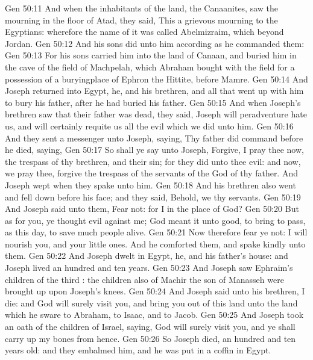 \vs Gen 50:11 And when the inhabitants of the land, the Canaanites, saw the mourning in the floor of Atad, they said, This  a grievous mourning to the Egyptians: wherefore the name of it was called Abelmizraim, which  beyond Jordan.
\vs Gen 50:12 And his sons did unto him according as he commanded them:
\vs Gen 50:13 For his sons carried him into the land of Canaan, and buried him in the cave of the field of Machpelah, which Abraham bought with the field for a possession of a buryingplace of Ephron the Hittite, before Mamre.
\vs Gen 50:14 And Joseph returned into Egypt, he, and his brethren, and all that went up with him to bury his father, after he had buried his father.
\vs Gen 50:15 And when Joseph's brethren saw that their father was dead, they said, Joseph will peradventure hate us, and will certainly requite us all the evil which we did unto him.
\vs Gen 50:16 And they sent a messenger unto Joseph, saying, Thy father did command before he died, saying,
\vs Gen 50:17 So shall ye say unto Joseph, Forgive, I pray thee now, the trespass of thy brethren, and their sin; for they did unto thee evil: and now, we pray thee, forgive the trespass of the servants of the God of thy father. And Joseph wept when they spake unto him.
\vs Gen 50:18 And his brethren also went and fell down before his face; and they said, Behold, we  thy servants.
\vs Gen 50:19 And Joseph said unto them, Fear not: for  I in the place of God?
\vs Gen 50:20 But as for you, ye thought evil against me;  God meant it unto good, to bring to pass, as  this day, to save much people alive.
\vs Gen 50:21 Now therefore fear ye not: I will nourish you, and your little ones. And he comforted them, and spake kindly unto them.
\vs Gen 50:22 And Joseph dwelt in Egypt, he, and his father's house: and Joseph lived an hundred and ten years.
\vs Gen 50:23 And Joseph saw Ephraim's children of the third : the children also of Machir the son of Manasseh were brought up upon Joseph's knees.
\vs Gen 50:24 And Joseph said unto his brethren, I die: and God will surely visit you, and bring you out of this land unto the land which he sware to Abraham, to Isaac, and to Jacob.
\vs Gen 50:25 And Joseph took an oath of the children of Israel, saying, God will surely visit you, and ye shall carry up my bones from hence.
\vs Gen 50:26 So Joseph died,  an hundred and ten years old: and they embalmed him, and he was put in a coffin in Egypt.
